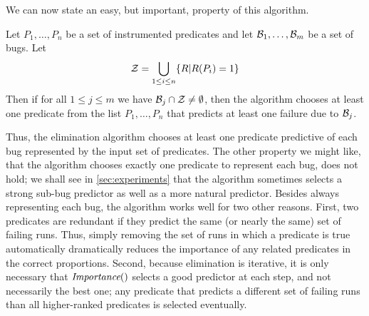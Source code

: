 
We can now state an easy, but important, property of this algorithm.  
\begin{lemma}
\rm
Let $P_1,\ldots,P_n$ be a set of instrumented predicates and let ${\cal B}_1,\ldots,{\cal B}_m$ be a set of bugs.  Let
\[ {\cal Z} = \bigcup_{1 \leq i \leq n} \{ R | R(P_i) = 1 \} \]
Then if for all $1 \leq j \leq m$ we have ${\cal B}_j \cap {\cal Z} \neq \emptyset$, then 
the algorithm chooses at least one predicate from the list $P_1,\ldots,P_n$ that predicts
at least one failure due to ${\cal B}_j$.
\end{lemma}

Thus, the elimination algorithm chooses at least one predicate 
predictive of each bug represented by the input set of predicates.
The other property we might like, that the algorithm chooses exactly
one predicate to represent each bug, does not hold; we shall see in
\autoref{sec:experiments} that the algorithm sometimes selects a
strong sub-bug predictor as well as a more natural predictor.  Besides
always representing each bug, the algorithm works well for two other
reasons.  First, two predicates are redundant if they predict the same
(or nearly the same) set of failing runs.  Thus, simply removing the
set of runs in which a predicate is true automatically dramatically
reduces the importance of any related predicates in the correct
proportions. Second, because elimination is
iterative, it is only necessary that $\textit{Importance}()$ selects a good
predictor at each step, and not necessarily the best one; any
predicate that predicts a different set of failing runs than all
higher-ranked predicates is selected eventually.


